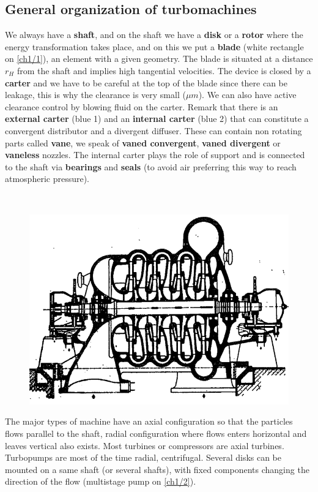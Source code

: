 \subsection{General organization of turbomachines}
We always have a \textbf{shaft}, and on the shaft we have a \textbf{disk} or a \textbf{rotor} where the energy transformation takes place, and on this we put a \textbf{blade} (white rectangle on \autoref{ch1/1}), an element with a given geometry. The blade is situated at a distance $r_H$ from the shaft and implies high tangential velocities. The device is closed by a \textbf{carter} and we have to be careful at the top of the blade since there can be leakage, this is why the clearance is very small ($\mu m$). We can also have active clearance control by blowing fluid on the carter. Remark that there is an \textbf{external carter} (blue 1) and an \textbf{internal carter} (blue 2) that can constitute a convergent distributor and a divergent diffuser. These can contain non rotating parts called \textbf{vane}, we speak of \textbf{vaned convergent}, \textbf{vaned divergent} or \textbf{vaneless} nozzles. The internal carter plays the role of support and is connected to the shaft via \textbf{bearings} and \textbf{seals} (to avoid air preferring this way to reach atmospheric pressure). 

\ \\
\begin{figure}
\vspace{-10mm}
\includegraphics[scale=0.3]{ch1/2}
\label{ch1/2}
\end{figure}
The major types of machine have an axial configuration so that the particles flows parallel to the shaft, radial configuration where flows enters horizontal and leaves vertical also exists. Most turbines or compressors are axial turbines. Turbopumps are most of the time radial, centrifugal. Several disks can be mounted on a same shaft (or several shafts), with fixed components changing the direction of the flow (multistage pump on \autoref{ch1/2}).

